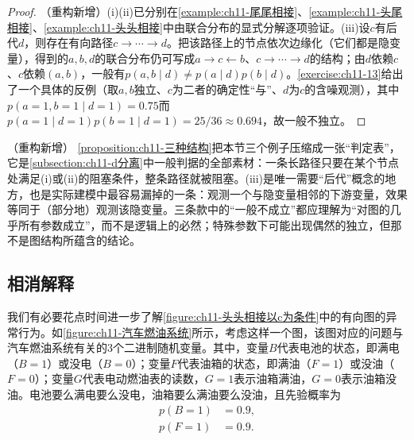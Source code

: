 \documentclass[../../main.tex]{subfiles}
\begin{document}
\begin{proof}
（重构新增）(i)(ii)已分别在\cref{example:ch11-尾尾相接}、\cref{example:ch11-头尾相接}、\cref{example:ch11-头头相接}中由联合分布的显式分解逐项验证。(iii)设$c$有后代$d$，则存在有向路径$c\to\cdots\to d$。把该路径上的节点依次边缘化（它们都是隐变量），得到的$a,b,d$的联合分布仍可写成$a\to c\leftarrow b$、$c\to\cdots\to d$的结构；由$d$依赖$c$、$c$依赖$(a,b)$，一般有$p(a,b\mid d)\neq p(a\mid d)p(b\mid d)$。\cref{exercise:ch11-13}给出了一个具体的反例（取$a,b$独立、$c$为二者的确定性“与”、$d$为$c$的含噪观测），其中$p(a=1,b=1\mid d=1)=0.75$而$p(a=1\mid d=1)p(b=1\mid d=1)=25/36\approx0.694$，故一般不独立。
\end{proof}

\begin{remark}（重构新增）
\cref{proposition:ch11-三种结构}把本节三个例子压缩成一张“判定表”，它是\cref{subsection:ch11-d分离}中一般判据的全部素材：一条长路径只要在某个节点处满足(i)或(ii)的阻塞条件，整条路径就被阻塞。(iii)是唯一需要“后代”概念的地方，也是实际建模中最容易漏掉的一条：观测一个与隐变量相邻的下游变量，效果等同于（部分地）观测该隐变量。三条款中的“一般不成立”都应理解为“对图的几乎所有参数成立”，而不是逻辑上的必然；特殊参数下可能出现偶然的独立，但那不是图结构所蕴含的结论。
\end{remark}

\subsection{相消解释}\label{subsection:ch11-相消解释}

我们有必要花点时间进一步了解\cref{figure:ch11-头头相接以c为条件}中的有向图的异常行为。如\cref{figure:ch11-汽车燃油系统}所示，考虑这样一个图，该图对应的问题与汽车燃油系统有关的3个二进制随机变量。其中，变量$B$代表电池的状态，即满电（$B=1$）或没电（$B=0$）；变量$F$代表油箱的状态，即满油（$F=1$）或没油（$F=0$）；变量$G$代表电动燃油表的读数，$G=1$表示油箱满油，$G=0$表示油箱没油。电池要么满电要么没电，油箱要么满油要么没油，且先验概率为
\begin{align}
  p(B=1) &= 0.9,\\
  p(F=1) &= 0.9.
\end{align}
\end{document}
